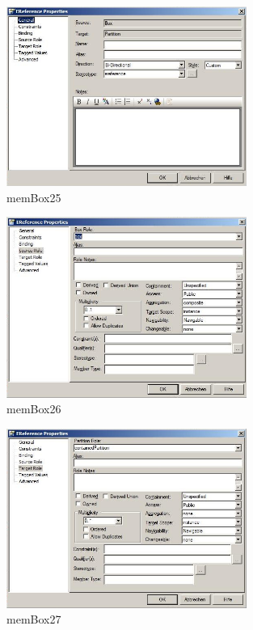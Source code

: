 \begin{figure}[htbp]
	\centering
  \includegraphics[width=0.7\textwidth]{pics/memBox25.png}
	\caption{memBox25}
	\label{memBox25}
\end{figure}

\begin{figure}[htbp]
	\centering
  \includegraphics[width=0.7\textwidth]{pics/memBox26.png}
	\caption{memBox26}
	\label{memBox26}
\end{figure}

\begin{figure}[htbp]
	\centering
  \includegraphics[width=0.7\textwidth]{pics/memBox27.png}
	\caption{memBox27}
	\label{memBox27}
\end{figure}

